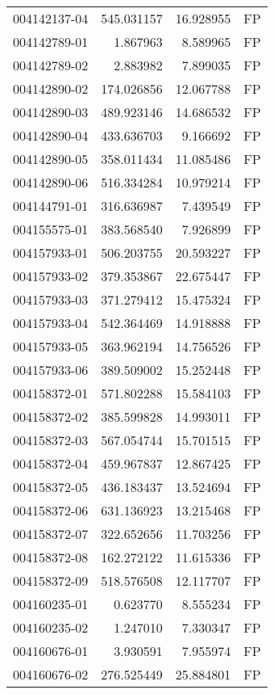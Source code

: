 \begin{tabular}{lrrl}
004142137-04 &  545.031157 &    16.928955 &   FP \\
004142789-01 &    1.867963 &     8.589965 &   FP \\
004142789-02 &    2.883982 &     7.899035 &   FP \\
004142890-02 &  174.026856 &    12.067788 &   FP \\
004142890-03 &  489.923146 &    14.686532 &   FP \\
004142890-04 &  433.636703 &     9.166692 &   FP \\
004142890-05 &  358.011434 &    11.085486 &   FP \\
004142890-06 &  516.334284 &    10.979214 &   FP \\
004144791-01 &  316.636987 &     7.439549 &   FP \\
004155575-01 &  383.568540 &     7.926899 &   FP \\
004157933-01 &  506.203755 &    20.593227 &   FP \\
004157933-02 &  379.353867 &    22.675447 &   FP \\
004157933-03 &  371.279412 &    15.475324 &   FP \\
004157933-04 &  542.364469 &    14.918888 &   FP \\
004157933-05 &  363.962194 &    14.756526 &   FP \\
004157933-06 &  389.509002 &    15.252448 &   FP \\
004158372-01 &  571.802288 &    15.584103 &   FP \\
004158372-02 &  385.599828 &    14.993011 &   FP \\
004158372-03 &  567.054744 &    15.701515 &   FP \\
004158372-04 &  459.967837 &    12.867425 &   FP \\
004158372-05 &  436.183437 &    13.524694 &   FP \\
004158372-06 &  631.136923 &    13.215468 &   FP \\
004158372-07 &  322.652656 &    11.703256 &   FP \\
004158372-08 &  162.272122 &    11.615336 &   FP \\
004158372-09 &  518.576508 &    12.117707 &   FP \\
004160235-01 &    0.623770 &     8.555234 &   FP \\
004160235-02 &    1.247010 &     7.330347 &   FP \\
004160676-01 &    3.930591 &     7.955974 &   FP \\
004160676-02 &  276.525449 &    25.884801 &   FP \\

\end{tabular}
